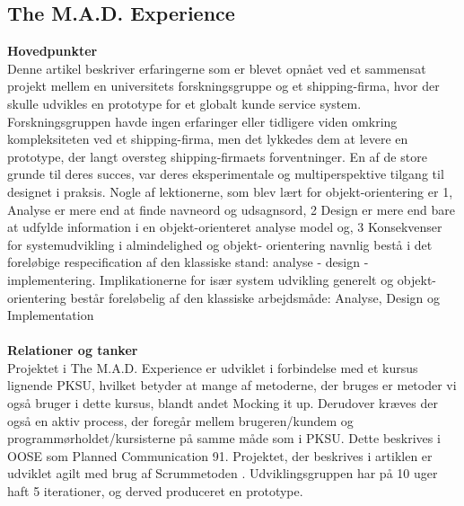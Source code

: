 \documentclass[a4paper]{article}
\begin{document}
\subsection{The M.A.D. Experience}
\textbf{Hovedpunkter}\\
Denne artikel beskriver erfaringerne som er blevet opnået ved et sammensat projekt mellem en universitets forskningsgruppe og et shipping-firma, hvor der skulle udvikles en prototype for et globalt kunde service system. Forskningsgruppen havde ingen erfaringer eller tidligere viden omkring kompleksiteten ved et shipping-firma, men det lykkedes dem at levere en prototype, der langt oversteg shipping-firmaets forventninger. En af de store grunde til deres succes, var deres eksperimentale og multiperspektive tilgang til designet i praksis. Nogle af lektionerne, som blev lært for objekt-orientering er 1, Analyse er mere end at finde navneord og udsagnsord, 2 Design er mere end bare at udfylde information i en objekt-orienteret analyse model og, 3 Konsekvenser for systemudvikling i almindelighed og objekt- orientering navnlig bestå i det foreløbige respecification af den klassiske stand: analyse - design - implementering. Implikationerne for især system udvikling generelt og objekt-orientering består foreløbelig af den klassiske arbejdsmåde: Analyse, Design og Implementation\\\\
\textbf{Relationer og tanker}\\
Projektet i The M.A.D. Experience er udviklet i forbindelse med et kursus lignende PKSU, hvilket betyder at mange af metoderne, der bruges er metoder vi også bruger i dette kursus, blandt andet Mocking it up\cite{Mockup}. Derudover kræves der også en aktiv process, der foregår mellem brugeren/kundem og programmørholdet/kursisterne på samme måde som i PKSU. Dette beskrives i OOSE som Planned Communication \cite{OOSE}{91}. Projektet, der beskrives i artiklen er udviklet agilt med brug af Scrummetoden \cite{Scrum}. Udviklingsgruppen har på 10 uger haft 5 iterationer, og derved produceret en prototype. 
\pagebreak
{}

\end{document}
